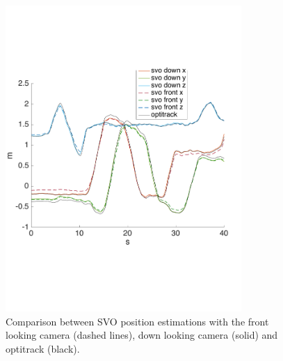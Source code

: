 \begin{figure}[!ht]
    \centering
    \includegraphics[width=0.8\textwidth]{img/comparision_between_two_svo_and_opti_position.pdf}
    \caption{Comparison between SVO position estimations with the front looking camera (dashed lines), down looking camera (solid) and optitrack (black).}
    \label{fig:comparision_svo_position}
\end{figure}

